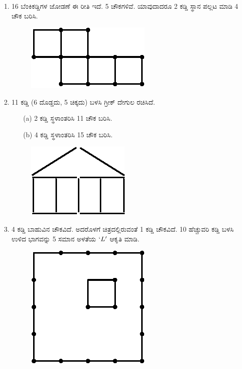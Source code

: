 \begin{enumerate}
\item 16 ಬೆಂಕಿಕಡ್ಡಿಗಳ ಜೋಡಣೆ ಈ ರೀತಿ ಇದೆ. 5 ಚೌಕಗಳಿವೆ. ಯಾವುದಾದರೂ 2 ಕಡ್ಡಿ ಸ್ಥಾನ ಪಲ್ಲಟ ಮಾಡಿ 4 ಚೌಕ ಬರಿಸಿ. 
\begin{figure}[H]
\centering
\includegraphics[scale=0.9]{images/chap9/q10.eps}
\end{figure}

\item 11 ಕಡ್ಡಿ (6 ದೊಡ್ಡದು, 5 ಚಿಕ್ಕದು) ಬಳಸಿ ಗ್ರೀಕ್ ದೇಗುಲ ರಚಿಸಿದೆ. 
\begin{itemize}
\item[(a)] 2 ಕಡ್ಡಿ ಸ್ಥಳಾಂತರಿಸಿ 11 ಚೌಕ ಬರಿಸಿ. 
\item[(b)] 4 ಕಡ್ಡಿ ಸ್ಥಳಾಂತರಿಸಿ 15 ಚೌಕ ಬರಿಸಿ. 
\end{itemize} 

\begin{figure}[H]
\centering
\includegraphics[scale=0.9]{images/chap9/q11.eps}
\end{figure}

\item 4 ಕಡ್ಡಿ ಬಾಹುವಿನ ಚೌಕವಿದೆ. ಅದರೊಳಗೆ ಚಿತ್ರದಲ್ಲಿರುವಂತೆ 1 ಕಡ್ಡಿ ಚೌಕವಿದೆ. 10 ಹೆಚ್ಚುವರಿ ಕಡ್ಡಿ ಬಳಸಿ ಉಳಿದ ಭಾಗವನ್ನು 5 ಸಮಾನ ಅಳತೆಯ $`L'$ ಆಕೃತಿ ಮಾಡಿ. 

\begin{figure}[H]
\centering
\includegraphics{images/chap9/q12.eps}
\end{figure}


\end{enumerate}
